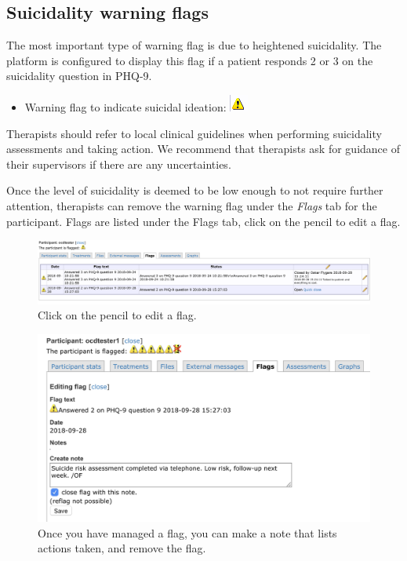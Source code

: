 \documentclass[]{book}
\providecommand{\tightlist}{%
  \setlength{\itemsep}{0pt}\setlength{\parskip}{0pt}}
\begin{document}
\hypertarget{suicidality-warning-flags}{%
\subsection{Suicidality warning flags}\label{suicidality-warning-flags}}

The most important type of warning flag is due to heightened suicidality. The platform is configured to display this flag if a patient responds 2 or 3 on the suicidality question in PHQ-9.

\begin{itemize}
\tightlist
\item
  Warning flag to indicate suicidal ideation: \includegraphics{images/suicidality-warning.png}
\end{itemize}

Therapists should refer to local clinical guidelines when performing suicidality assessments and taking action. We recommend that therapists ask for guidance of their supervisors if there are any uncertainties.

Once the level of suicidality is deemed to be low enough to not require further attention, therapists can remove the warning flag under the \emph{Flags} tab for the participant. Flags are listed under the Flags tab, click on the pencil to edit a flag.

\begin{figure}
\centering
\includegraphics{images/flags-tab.png}
\caption{Click on the pencil to edit a flag.}
\end{figure}

\begin{figure}
\centering
\includegraphics{images/remove-flag.png}
\caption{Once you have managed a flag, you can make a note that lists actions taken, and remove the flag.}
\end{figure}
\end{document}
